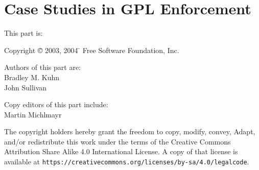 %






\part{Case Studies in GPL Enforcement}

{\parindent 0in
This part is: \\
\begin{tabbing}
Copyright \= \copyright{} 2003, 2004 \= \hspace{.2in} Free Software Foundation, Inc. \\
\end{tabbing}

\vspace{1in}

\begin{center}
Authors of this part are: \\

Bradley M. Kuhn \\
John Sullivan
\vspace{3in}

Copy editors of this part include: \\
Martin Michlmayr

\vspace{3in}

The copyright holders hereby grant the freedom to copy, modify, convey,
Adapt, and/or redistribute this work under the terms of the Creative Commons
Attribution Share Alike 4.0 International License.  A copy of that license is
available at \verb=https://creativecommons.org/licenses/by-sa/4.0/legalcode=.
\end{center}
}

